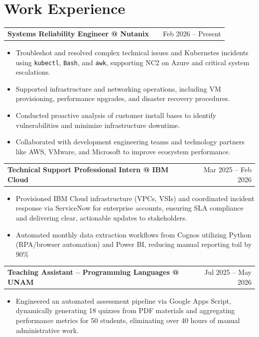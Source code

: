 \documentclass[a4paper,11pt]{article}
\makeatletter
\newenvironment{joblong}[2]
    {
    \begin{tabularx}{\linewidth}{@{}l X r@{}}
    \textbf{#1} & \hfill &  #2 \\[3.75pt]
    \end{tabularx}
    \begin{minipage}[t]{\linewidth}
    \begin{itemize}[nosep,after=\strut, leftmargin=1em, itemsep=3pt]
    }
    {
    \end{itemize}
    \end{minipage}    
    }
\makeatother
\begin{document}
\section{Work Experience}

\begin{joblong}{Systems Reliability Engineer @ Nutanix}{Feb 2026 -- Present}
\item Troubleshot and resolved complex technical issues and Kubernetes incidents using \texttt{kubectl}, \texttt{Bash}, and \texttt{awk}, supporting NC2 on Azure and critical system escalations.
\item Supported infrastructure and networking operations, including VM provisioning, performance upgrades, and disaster recovery procedures.
\item Conducted proactive analysis of customer install bases to identify vulnerabilities and minimize infrastructure downtime.
\item Collaborated with development engineering teams and technology partners like AWS, VMware, and Microsoft to improve ecosystem performance.
\end{joblong}

\begin{joblong}{Technical Support Professional Intern @ IBM Cloud}{Mar 2025 -- Feb 2026}
\item Provisioned IBM Cloud infrastructure (VPCs, VSIs) and coordinated incident response via ServiceNow for enterprise accounts, ensuring SLA compliance and delivering clear, actionable updates to stakeholders.
\item Automated monthly data extraction workflows from Cognos utilizing Python (RPA/browser
    automation) and Power BI, reducing manual reporting toil by 90\%
\end{joblong}


\begin{joblong}{Teaching Assistant -- Programming Languages @ UNAM}{Jul 2025 -- May 2026}
\item Engineered an automated assessment pipeline via Google Apps Script, dynamically generating 18 quizzes from PDF materials and aggregating performance metrics for 50 students, eliminating over 40 hours of manual administrative work.
\end{joblong}

\end{document}
